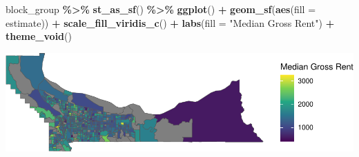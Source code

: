 \documentclass[
]{article}
\newenvironment{Shaded}{\begin{snugshade}}{\end{snugshade}}
\newcommand{\AttributeTok}[1]{\textcolor[rgb]{0.13,0.29,0.53}{#1}}
\newcommand{\FunctionTok}[1]{\textcolor[rgb]{0.13,0.29,0.53}{\textbf{#1}}}
\newcommand{\NormalTok}[1]{#1}
\newcommand{\SpecialCharTok}[1]{\textcolor[rgb]{0.81,0.36,0.00}{\textbf{#1}}}
\newcommand{\StringTok}[1]{\textcolor[rgb]{0.31,0.60,0.02}{#1}}
\begin{document}
\begin{Shaded}
\begin{Highlighting}[]
\NormalTok{block\_group }\SpecialCharTok{\%\textgreater{}\%}
  \FunctionTok{st\_as\_sf}\NormalTok{() }\SpecialCharTok{\%\textgreater{}\%}
    \FunctionTok{ggplot}\NormalTok{() }\SpecialCharTok{+}
    \FunctionTok{geom\_sf}\NormalTok{(}\FunctionTok{aes}\NormalTok{(}\AttributeTok{fill =}\NormalTok{ estimate)) }\SpecialCharTok{+}
    \FunctionTok{scale\_fill\_viridis\_c}\NormalTok{() }\SpecialCharTok{+}
    \FunctionTok{labs}\NormalTok{(}\AttributeTok{fill =} \StringTok{"Median Gross Rent"}\NormalTok{) }\SpecialCharTok{+}
    \FunctionTok{theme\_void}\NormalTok{()}
\end{Highlighting}
\end{Shaded}

\includegraphics{lab06_files/figure-latex/unnamed-chunk-8-3.pdf}
\end{document}
